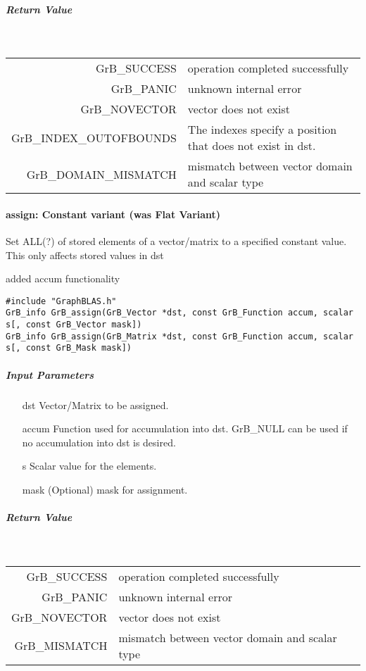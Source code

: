 \subparagraph{Return Value}~

\begin{tabular}{rl}
{\sf GrB\_SUCCESS}	& operation completed successfully \\
{\sf GrB\_PANIC}	& unknown internal error \\
{\sf GrB\_NOVECTOR}	& vector does not exist \\
{\sf GrB\_INDEX\_OUTOFBOUNDS} & The indexes specify a position that does not exist in dst. \\
{\sf GrB\_DOMAIN\_MISMATCH}	& mismatch between vector domain and scalar type \\
\end{tabular}

\paragraph{{\sf assign}: Constant variant (was Flat Variant)}

Set ALL(?) of stored elements of a vector/matrix to a specified constant value.
This only affects stored values in dst

{\scott added accum functionality}

\begin{verbatim}
#include "GraphBLAS.h"
GrB_info GrB_assign(GrB_Vector *dst, const GrB_Function accum, scalar s[, const GrB_Vector mask])
GrB_info GrB_assign(GrB_Matrix *dst, const GrB_Function accum, scalar s[, const GrB_Mask mask])
\end{verbatim}

\subparagraph{Input Parameters}

\begin{itemize}
	\item[{\sf dst}]   Vector/Matrix to be assigned.
	\item[{\sf accum}] Function used for accumulation into dst.  {\sf GrB\_NULL}
                       can be used if no accumulation into dst is desired.
	\item[{\sf s}]     Scalar value for the elements.
	\item[{\sf mask}]  (Optional) mask for assignment.  
\end{itemize}

\subparagraph{Return Value}~

\begin{tabular}{rl}
{\sf GrB\_SUCCESS}	& operation completed successfully \\
{\sf GrB\_PANIC}	& unknown internal error \\
{\sf GrB\_NOVECTOR}	& vector does not exist \\
{\sf GrB\_MISMATCH}	& mismatch between vector domain and scalar type \\
\end{tabular}
